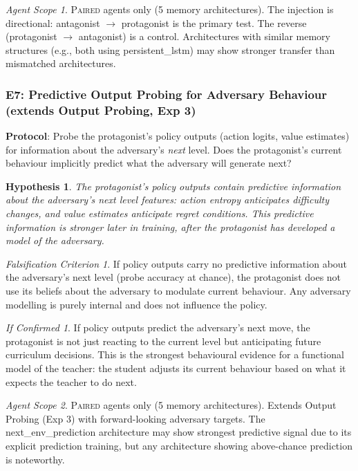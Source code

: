 \documentclass[11pt,a4paper]{article}
\newtheorem{hypothesis}{Hypothesis}[subsection]
\theoremstyle{remark}
\newtheorem*{falsification}{Falsification Criterion}
\newtheorem*{implication}{If Confirmed}
\newtheorem*{agentscope}{Agent Scope}
\newcommand{\paired}{\textsc{Paired}}
\begin{document}
\begin{agentscope}
\paired{} agents only (5 memory architectures). The injection is directional: antagonist $\to$ protagonist is the primary test. The reverse (protagonist $\to$ antagonist) is a control. Architectures with similar memory structures (e.g., both using persistent\_lstm) may show stronger transfer than mismatched architectures.
\end{agentscope}

\subsubsection{E7: Predictive Output Probing for Adversary Behaviour (extends Output Probing, Exp 3)}
\label{exp:e7}

\textbf{Protocol}: Probe the protagonist's policy outputs (action logits, value estimates) for information about the adversary's \textit{next} level. Does the protagonist's current behaviour implicitly predict what the adversary will generate next?

\begin{hypothesis}
The protagonist's policy outputs contain predictive information about the adversary's next level features: action entropy anticipates difficulty changes, and value estimates anticipate regret conditions. This predictive information is stronger later in training, after the protagonist has developed a model of the adversary.
\end{hypothesis}

\begin{falsification}
If policy outputs carry no predictive information about the adversary's next level (probe accuracy at chance), the protagonist does not use its beliefs about the adversary to modulate current behaviour. Any adversary modelling is purely internal and does not influence the policy.
\end{falsification}

\begin{implication}
If policy outputs predict the adversary's next move, the protagonist is not just reacting to the current level but anticipating future curriculum decisions. This is the strongest behavioural evidence for a functional model of the teacher: the student adjusts its current behaviour based on what it expects the teacher to do next.
\end{implication}

\begin{agentscope}
\paired{} agents only (5 memory architectures). Extends Output Probing (Exp 3) with forward-looking adversary targets. The next\_env\_prediction architecture may show strongest predictive signal due to its explicit prediction training, but any architecture showing above-chance prediction is noteworthy.
\end{agentscope}
\end{document}
